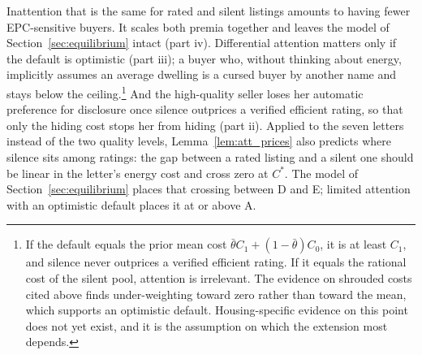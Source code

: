 Inattention that is the same for rated and silent listings amounts to having fewer EPC-sensitive buyers. It scales both premia together and leaves the model of Section~\ref{sec:equilibrium} intact (part iv). Differential attention matters only if the default is optimistic (part iii); a buyer who, without thinking about energy, implicitly assumes an average dwelling is a cursed buyer by another name and stays below the ceiling.\footnote{If the default equals the prior mean cost $\bar\theta C_1+(1-\bar\theta)C_0$, it is at least $C_1$, and silence never outprices a verified efficient rating. If it equals the rational cost of the silent pool, attention is irrelevant. The evidence on shrouded costs cited above finds under-weighting toward zero rather than toward the mean, which supports an optimistic default. Housing-specific evidence on this point does not yet exist, and it is the assumption on which the extension most depends.} And the high-quality seller loses her automatic preference for disclosure once silence outprices a verified efficient rating, so that only the hiding cost stops her from hiding (part ii). Applied to the seven letters instead of the two quality levels, Lemma~\ref{lem:att_prices} also predicts where silence sits among ratings: the gap between a rated listing and a silent one should be linear in the letter's energy cost and cross zero at $C^*$. The model of Section~\ref{sec:equilibrium} places that crossing between D and E; limited attention with an optimistic default places it at or above A.
